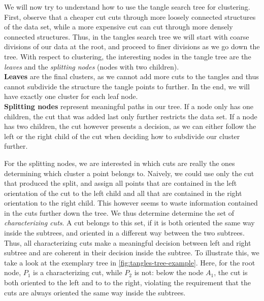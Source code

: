 We will now try to understand how to use the tangle search tree for clustering. 
First, observe that a cheaper cut cuts through more loosely connected structures
of the data set, while a more expensive cut can cut through more densely connected structures.
Thus, in the tangles search tree we will start with coarse divisions of our data
at the root, and proceed to finer divisions as we go down the tree. With respect to clustering, the interesting nodes in the tangle tree are the \textit{leaves} and
the \textit{splitting nodes} (nodes with two children). \\
\textbf{Leaves} are the final clusters, as we cannot add more cuts to the tangles and thus cannot subdivide the structure the tangle points to further. In the end, we will have
exactly one cluster for each leaf node.\\
\textbf{Splitting nodes} represent meaningful paths in our tree. If a node only has one children,
the cut that was added last only further restricts the data set. If a node has two children, 
the cut however presents a decision, as we can either follow the left or the right
child of the cut when deciding how to subdivide our cluster further. 

For the splitting nodes, we are interested in which cuts are really the ones determining 
which cluster a point belongs to. Naively, we could use only the cut that produced the split,
and assign all points that are contained in the left orientation of the cut to the
left child and all that are contained in the right orientation to the right child. This
however seems to waste information contained in the cuts further down the tree. 
We thus determine determine the set of \textit{characterizing cuts}.  
A cut belongs to this set, if it is both oriented the same way inside the subtrees, and oriented in a different way between the two subtrees. Thus, all characterizing cuts make a meaningful decision between left and right subtree and are coherent in their decision inside the subtree. 
To illustrate this, we take a look at the exemplary tree in \autoref{fig:tangles-tree-example}. Here, for the root node, $P_1$ is a characterizing cut,
while $P_2$ is not: below the node $A_1$, the cut is both oriented to the left and to to the right, violating the requirement that the cuts are always oriented
the same way inside the subtrees. 


